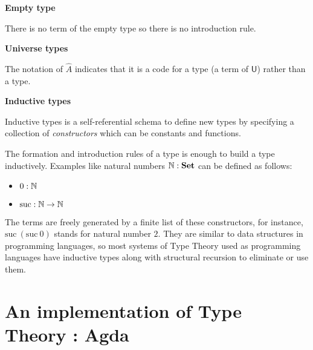 

\textbf{Empty type}


\begin{multicols}{2}

\columnbreak


\end{multicols}

There is no term of the empty type so there is no introduction rule.

\textbf{Universe types}


\begin{multicols}{2}



\columnbreak


\end{multicols}

The notation of $\hat{A}$ indicates that it is a code for a type (a term of $\mathsf{U}$) rather than a type.


\textbf{Inductive types}\label{df:inductivetypes}

Inductive types is a self-referential schema to define new types by specifying a collection of \emph{constructors} which can be constants and functions.

The formation and introduction rules of a type is enough to build a type inductively. Examples like
natural numbers $\mathbb{N} : \operatorname{\mathbf{Set}}$ can be defined as follows:

\begin{itemize}
\item $0 : \mathbb{N}$
\item $\text{suc} : \mathbb{N} \rightarrow \mathbb{N}$
\end{itemize}

The terms are freely generated by a finite list of these constructors, for instance, $\text{suc} ~(\text{suc} ~0)$ stands for natural number $2$. They are similar to data structures in programming languages, so most systems of Type Theory used as programming languages have inductive types along with structural recursion to eliminate or use them.


\section{An implementation of Type Theory : Agda}

